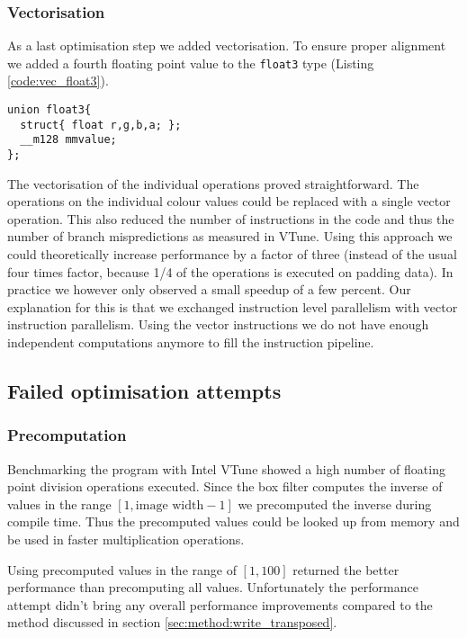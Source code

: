 \subsubsection{Vectorisation}
As a last optimisation step we added vectorisation. To ensure proper alignment we added a fourth floating point value to the \lstinline{float3} type (Listing \ref{code:vec_float3}).
\begin{lstlisting}[label=Vectorised float3 type, label=code:vec_float3] 
union float3{
  struct{ float r,g,b,a; };
  __m128 mmvalue;
};
\end{lstlisting}
The vectorisation of the individual operations proved straightforward. The operations on the individual colour values could be replaced with a single vector operation. This also reduced the number of instructions in the code and thus the number of branch mispredictions as measured in VTune. Using this approach we could theoretically increase performance by a factor of three (instead of the usual four times factor, because 1/4 of the operations is executed on padding data). In practice we however only observed a small speedup of a few percent. Our explanation for this is that we exchanged instruction level parallelism with vector instruction parallelism. Using the vector instructions we do not have enough independent computations anymore to fill the instruction pipeline.

\subsection{Failed optimisation attempts}

\subsubsection{Precomputation} 

Benchmarking the program with Intel VTune showed a high number of floating point division operations executed. Since the box filter computes the inverse of values in the range $[1,\text{image width}-1]$ we precomputed the inverse during compile time. Thus the precomputed values could be looked up from memory and be used in faster multiplication operations.

Using precomputed values in the range of $[1,100]$ returned the better performance than precomputing all values. Unfortunately the performance attempt didn't bring any overall performance improvements compared to the method discussed in section \ref{sec:method:write_transposed}.

